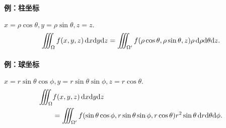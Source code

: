 \paragraph{例：柱坐标}$x=\rho\cos\theta,y=\rho\sin\theta,z=z.$
\[
	\inttt_\Omega f(x,y,z)\d x\nd y\nd z=\inttt_{\Omega'}f(\rho\cos\theta,\rho\sin\theta,z)\rho\d\rho\nd\theta\nd z.
\]
\paragraph{例：球坐标}$x=r\sin\theta\cos\phi,y=r\sin\theta\sin\phi,z=r\cos\theta.$
\begin{align*}
	\inttt_\Omega & f(x,y,z)\d x\nd y\nd z                                                                                   \\
				  & =\inttt_{\Omega'}f(\sin\theta\cos\phi,r\sin\theta\sin\phi,r\cos\theta)r^2\sin\theta\d r\nd\theta\nd\phi.
\end{align*}
